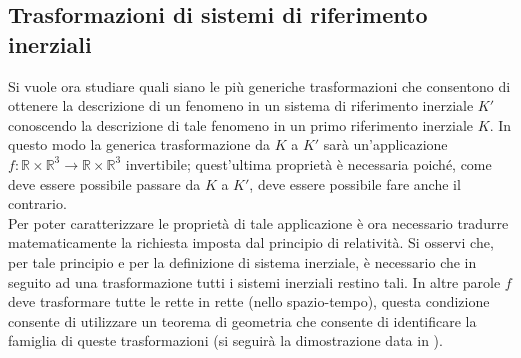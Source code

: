 \subsection{Trasformazioni di sistemi di riferimento inerziali}
Si vuole ora studiare quali siano le più generiche trasformazioni che consentono di ottenere la descrizione di un fenomeno in un sistema di riferimento inerziale $K'$ conoscendo la descrizione di tale fenomeno in un primo riferimento inerziale $K$. In questo modo la generica trasformazione da $K$ a $K'$ sarà un'applicazione $f:\mathbb{R}\times \mathbb{R}^3\rightarrow\mathbb{R}\times \mathbb{R}^3$ invertibile; quest'ultima proprietà è necessaria poiché, come deve essere possibile passare da $K$ a $K'$, deve essere possibile fare anche il contrario.\\
Per poter caratterizzare le proprietà di tale applicazione è ora necessario tradurre matematicamente la richiesta imposta dal principio di relatività. Si osservi che, per tale principio e per la definizione di sistema inerziale, è necessario che in seguito ad una trasformazione tutti i sistemi inerziali restino tali. In altre parole $f$ deve trasformare tutte le rette in rette (nello spazio-tempo), questa condizione consente di utilizzare un teorema di geometria che consente di identificare la famiglia di queste trasformazioni (si seguirà la dimostrazione data in \cite{LostThmOfGeometry}). 

